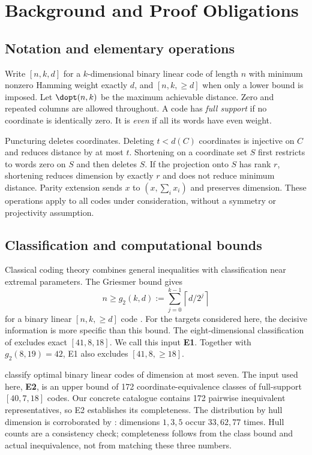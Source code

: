 \section{Background and Proof Obligations}
\subsection{Notation and elementary operations}
Write $[n,k,d]$ for a $k$-dimensional binary linear code of length $n$ with minimum nonzero Hamming weight exactly $d$, and $[n,k,\ge d]$ when only a lower bound is imposed. Let $\dopt(n,k)$ be the maximum achievable distance. Zero and repeated columns are allowed throughout. A code has \emph{full support} if no coordinate is identically zero. It is \emph{even} if all its words have even weight.

Puncturing deletes coordinates. Deleting $t<d(C)$ coordinates is injective on $C$ and reduces distance by at most $t$. Shortening on a coordinate set $S$ first restricts to words zero on $S$ and then deletes $S$. If the projection onto $S$ has rank $r$, shortening reduces dimension by exactly $r$ and does not reduce minimum distance. Parity extension sends $x$ to $(x,\sum_i x_i)$ and preserves dimension. These operations apply to all codes under consideration, without a symmetry or projectivity assumption.

\subsection{Classification and computational bounds}
Classical coding theory combines general inequalities with classification near extremal parameters. The Griesmer bound gives
\begin{equation}\label{eq:griesmer}
 n\ge g_2(k,d):=\sum_{j=0}^{k-1}\left\lceil d/2^j\right\rceil
\end{equation}
for a binary linear $[n,k,\ge d]$ code \citep{griesmer1960}. For the targets considered here, the decisive information is more specific than this bound. The eight-dimensional classification of \citet{bouyukliev2000} excludes exact $[41,8,18]$. We call this input \textbf{E1}. Together with $g_2(8,19)=42$, E1 also excludes $[41,8,\ge18]$.

\citet{bouyukliev2001} classify optimal binary linear codes of dimension at most seven. The input used here, \textbf{E2}, is an upper bound of 172 coordinate-equivalence classes of full-support $[40,7,18]$ codes. Our concrete catalogue contains 172 pairwise inequivalent representatives, so E2 establishes its completeness. The distribution by hull dimension is corroborated by \citet{bouyuklieva2025}: dimensions $1,3,5$ occur $33,62,77$ times. Hull counts are a consistency check; completeness follows from the class bound and actual inequivalence, not from matching these three numbers.

